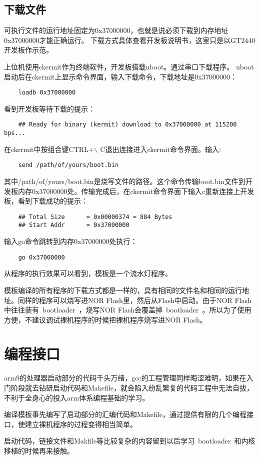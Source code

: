 \documentclass[a4paper,11pt]{article}
\begin{document}
\subsection{下载文件}
可执行文件的运行地址固定为0x37000000，也就是说必须下载到内存地址0x37000000才能正确运行。
下载方式具体查看开发板说明书，这里只是以GT2440开发板作示范。
\par
上位机使用ckermit作为终端软件，开发板搭载uboot。通过串口下载程序。
uboot启动后在ckermit上显示命令界面，输入下载命令，下载地址是0x37000000：
\begin{lstlisting}
	loadb 0x37000000
\end{lstlisting}
看到开发板等待下载的提示：
\begin{lstlisting}
	## Ready for binary (kermit) download to 0x37000000 at 115200 bps...
\end{lstlisting}
在ckermit中按组合键CTRL+$\backslash$ C退出连接进入ckermit命令界面。输入:
\begin{lstlisting}
	send /path/of/yours/boot.bin
\end{lstlisting}
其中/path/of/yours/boot.bin是烧写文件的路径。这个命令传输boot.bin文件到开发板内存0x37000000处。传输完成后，在ckermit命令界面下输入c重新连接上开发板，看到下载成功的提示：
\begin{lstlisting}
	## Total Size      = 0x00000374 = 884 Bytes
	## Start Addr      = 0x37000000
\end{lstlisting}
输入go命令跳转到内存0x37000000处执行：
\begin{lstlisting}
	go 0x37000000
\end{lstlisting}
从程序的执行效果可以看到，模板是一个流水灯程序。
\par
模板编译的所有程序的下载方式都是一样的，具有相同的文件名和相同的运行地址。同样的程序可以烧写进NOR Flash里，然后从Flash中启动。由于NOR Flash中往往装有~bootloader~，烧写NOR Flash会覆盖掉~bootloader~。所以为了使用方便，不建议调试裸机程序的时候把裸机程序烧写进NOR Flash。

\section{编程接口}
arm9的处理器启动部分的代码千头万绪，gcc的工程管理同样晦涩难明，如果在入门阶段就去钻研启动代码和Makefile，就会陷入纷乱繁复的代码工程中无法自拔，不利于全身心的投入arm体系编程基础的学习。
\par
编译模板事先编写了启动部分的汇编代码和Makefile，通过提供有限的几个编程接口，使建立裸机程序的过程变得相当简单。
\par
启动代码，链接文件和Makfile等比较复杂的内容留到以后学习~bootloader~和内核移植的时候再来接触。
\end{document}
